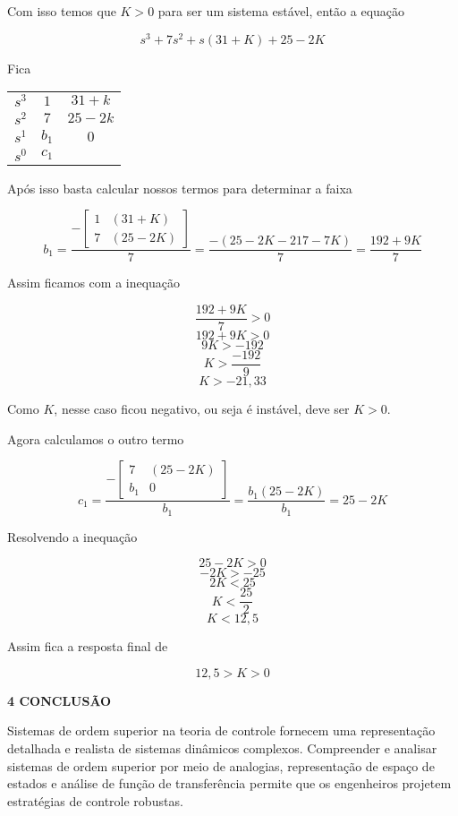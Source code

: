 Com isso temos que \( K > 0 \) para ser um sistema estável, então a equação

\[ s^3 + 7s^2 + s(31 + K)+25 -2K \]

Fica

\begin{table}[H]
	\centering
    \begin{tabular}{ccc}
        $s^3$ & $1$   & $31+k$ \\
        $s^2$ & $7$   & $25-2k$ \\
        $s^1$ & $b_1$ & $0$ \\
        $s^0$ & $c_1$ &  \\
    \end{tabular}
\end{table}

Após isso basta calcular nossos termos para determinar a faixa

\[ b_1 =  \dfrac{
-\begin{bmatrix}
1 & (31+K) \\
7 & (25-2K)  
\end{bmatrix}
}{7} = \dfrac{-(25-2K-217-7K)}{7} = \dfrac{192+9K}{7} \]

Assim ficamos com a inequação

\[ \dfrac{192+9K}{7} > 0 \]
\[ 192+9K > 0 \]
\[ 9K > -192 \]
\[  K > \dfrac{-192}{9} \]
\[  K > -21,33 \]

Como \( K \), nesse caso ficou negativo, ou seja é instável, deve ser \( K > 0 \).
\newpage

Agora calculamos o outro termo


\[ c_1 =  \dfrac{
-\begin{bmatrix}
7   & (25-2K) \\
b_1 & 0  
\end{bmatrix}
}{b_1} = \dfrac{b_1 (25-2K)}{b_1} = 25-2K \]

Resolvendo a inequação


\[ 25-2K > 0 \]
\[ -2K > -25 \]
\[ 2K < 25 \]
\[ K < \dfrac{25}{2} \]
\[ K < 12,5 \]

Assim fica a resposta final de

\[ \boxed{12,5 > K > 0} \]



\newpage

\begin{flushleft}
	 \textcolor{myBlue}{\textbf{\Large{4 CONCLUSÃO }}}
\end{flushleft}

Sistemas de ordem superior na teoria de controle fornecem uma representação detalhada e realista de sistemas dinâmicos complexos. Compreender e analisar sistemas de ordem superior por meio de analogias, representação de espaço de estados e análise de função de transferência permite que os engenheiros projetem estratégias de controle robustas. \\

